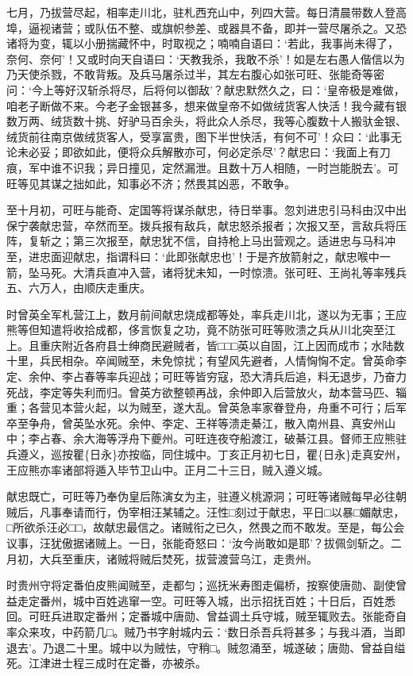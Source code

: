\documentclass[]{article}
\begin{document}
七月，乃拔营尽起，相率走川北，驻札西充山中，列四大营。每日清晨带数人登高埠，逼视诸营；或队伍不整、或旗帜参差、或器具不备，即并一营尽屠杀之。又恐诸将为变，辄以小册揣藏怀中，时取视之；喃喃自语曰：`若此，我事尚未得了，奈何、奈何'！又或时向天自语曰：`天教我杀，我敢不杀'！如是左右愚人偕信以为乃天使杀戮，不敢背叛。及兵马屠杀过半，其左右腹心如张可旺、张能奇等密问：`今上等好汉斩杀将尽，后将何以御敌'？献忠默然久之，曰：`皇帝极是难做，咱老子断做不来。今老子金银甚多，想来做皇帝不如做绒货客人快活！我今藏有银数万两、绒货数十挑、好驴马百余头，将此众人杀尽，我等心腹数十人搬驮金银、绒货前往南京做绒货客人，受享富贵，图下半世快活，有何不可'！众曰：`此事无论未必妥；即欲如此，便将众兵解散亦可，何必定杀尽'？献忠曰：`我面上有刀痕，军中谁不识我；异日撞见，定然漏泄。且数十万人相随，一时岂能脱去'。可旺等见其谋之拙如此，知事必不济；然畏其凶恶，不敢争。

至十月初，可旺与能奇、定国等将谋杀献忠，待日举事。忽刘进忠引马科由汉中出保宁袭献忠营，卒然而至。拨兵报有敌兵，献忠怒杀报者；次报又至，言敌兵将压阵，复斩之；第三次报至，献忠犹不信，自持枪上马出营观之。适进忠与马科冲至，进忠面迎献忠，指谓科曰：`此即张献忠也'！于是齐放箭射之，献忠喉中一箭，坠马死。大清兵直冲入营，诸将犹未知，一时惊溃。张可旺、王尚礼等率残兵五、六万人，由顺庆走重庆。

时曾英全军札营江上，数月前间献忠烧成都等处，率兵走川北，遂以为无事；王应熊等但知遣将收拾成都，侈言恢复之功，竟不防张可旺等败溃之兵从川北突至江上。且重庆附近各府县士绅商民避贼者，皆□□□英以自固，江上因而成市；水陆数十里，兵民相杂。卒闻贼至，未免惊扰；有望风先避者，人情恟恟不定。曾英命李定、余仲、李占春等率兵迎战；可旺等皆穷寇，恐大清兵后追，料无退步，乃奋力死战，李定等失利而归。曾英方欲整顿再战，余仲即入后营放火，劫本营马匹、辎重；各营见本营火起，以为贼至，遂大乱。曾英急率家眷登舟，舟重不可行；后军卒至争舟，曾英坠水死。余仲、李定、王祥等溃走綦江，散入南州县、真安州山中；李占春、余大海等浮舟下夔州。可旺连夜夺船渡江，破綦江县。督师王应熊驻兵遵义，巡按瞿\{日永\}亦按临，同住城中。丁亥正月初七日，瞿\{日永\}走真安州，王应熊亦率诸部将遁入毕节卫山中。正月二十三日，贼入遵义城。

献忠既亡，可旺等乃奉伪皇后陈演女为主，驻遵义桃源洞；可旺等诸贼每早必往朝贼后，凡事奉请而行，伪宰相汪某辅之。汪性□刻过于献忠，平日□以暴□媚献忠，□所欲杀汪必□□，故献忠最信之。诸贼衔之已久，然畏之而不敢发。至是，每公会议事，汪犹傲据诸贼上。一日，张能奇怒曰：`汝今尚敢如是耶'？拔佩剑斩之。二月初，大兵至重庆，诸贼将贼后焚死，拔营渡营乌江，走贵州。

时贵州守将定番伯皮熊闻贼至，走都匀；巡抚米寿图走偏桥，按察使唐勋、副使曾益走定番州，城中百姓逃窜一空。可旺等入城，出示招抚百姓；十日后，百姓悉回。可旺兵进取定番州；定番城中唐勋、曾益调土兵守城，贼至辄败去。张能奇自率众来攻，中药箭几□。贼乃书字射城内云：`数日杀吾兵将甚多；与我斗酒，当即退去'。乃退二十里。城中以为贼怯，守稍□。贼忽涌至，城遂破；唐勋、曾益自缢死。江津进士程三成时在定番，亦被杀。
\end{document}
